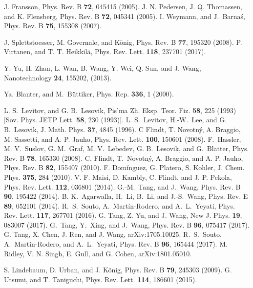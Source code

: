 \documentclass[aps,prb,twocolumn,footinbib,showpacs,superscriptaddress,preprintnumbers,amsmath,amssymb]{revtex4-1}
\begin{document}
\begin{thebibliography}{99}
 J. Fransson, Phys. Rev. B {\bf 72}, 045415 (2005).
 J. N. Pedersen, J. Q. Thomassen, and K. Flensberg, Phys. Rev. B {\bf 72}, 045341 (2005).
 I. Weymann, and J.~Barna\'{s}, Phys. Rev. B {\bf 75}, 155308 (2007).

 J. Splettstoesser, M. Governale, and K\"{o}nig, Phys. Rev. B {\bf 77}, 195320 (2008).
 P. Virtanen, and T. T. Heikkil\"{a}, Phys. Rev. Lett. {\bf 118}, 237701 (2017).

 Y. Yu, H. Zhan, L. Wan, B. Wang, Y. Wei, Q. Sun, and J. Wang, Nanotechnology {\bf 24}, 155202, (2013).

 Ya. Blanter, and M.~B\"{u}ttiker, Phys. Rep. {\bf 336}, 1 (2000).

 L. S.~Levitov, and G. B.~Lesovik, Pis'ma Zh. Eksp. Teor. Fiz. {\bf 58}, 225 (1993) [Sov. Phys. JETP Lett. {\bf 58}, 230 (1993)].
 L. S.~Levitov, H.-W.~Lee, and G. B.~Lesovik, J. Math. Phys. {\bf 37}, 4845 (1996).
 C Flindt, T. Novotn\'{y}, A. Braggio, M. Sassetti, and A. P. Jauho, Phys. Rev. Lett. {\bf 100}, 150601 (2008).
 F.~Hassler, M. V.~Suslov, G. M.~Graf, M. V.~Lebedev, G. B.~Lesovik, and G.~Blatter, Phys. Rev. B {\bf 78}, 165330 (2008).
 C. Flindt, T.~Novotn\'{y}, A. Braggio, and A. P. Jauho, Phys. Rev. B {\bf 82}, 155407 (2010).
 F. Dom\'{i}nguez, G. Platero, S. Kohler, J. Chem. Phys. {\bf 375}, 284 (2010).
 V. F. Maisi, D. Kambly, C. Flindt, and J. P. Pekola, Phys. Rev. Lett. {\bf 112}, 036801 (2014).
 G.-M.~Tang, and J.~Wang, Phys. Rev. B {\bf 90}, 195422 (2014).
 B. K.~Agarwalla, H.~Li, B.~Li, and J.-S.~Wang, Phys. Rev. E {\bf 89}, 052101 (2014).
 R.~S.~Souto, A.~Mart\'{i}n-Rodero, and A.~L.~Yeyati, Phys. Rev. Lett. {\bf 117}, 267701 (2016).
 G. Tang, Z. Yu, and J. Wang, New J. Phys. {\bf 19}, 083007 (2017).
 G.~Tang, Y.~Xing, and J.~Wang, Phys. Rev. B {\bf 96}, 075417 (2017).
 G. Tang, X. Chen, J. Ren, and J. Wang, arXiv:1705.10025.
 R.~S.~Souto, A.~Mart\'{i}n-Rodero, and A.~L.~Yeyati, Phys. Rev. B {\bf 96}, 165444 (2017).
 M. Ridley, V. N. Singh, E. Gull, and G. Cohen, arXiv:1801.05010.

 S. Lindebaum, D. Urban, and J. K\"{o}nig, Phys. Rev. B {\bf 79}, 245303 (2009).
 G. Utsumi, and T. Taniguchi, Phys. Rev. Lett. {\bf 114}, 186601 (2015).


\end{thebibliography}
\end{document}
